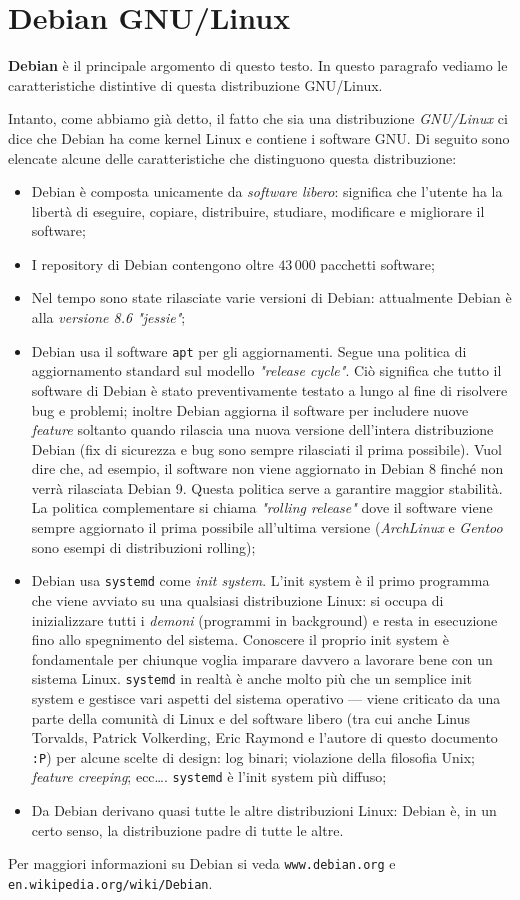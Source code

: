 \section{Debian GNU/Linux}
\textbf{Debian} è il principale argomento di questo testo. In questo paragrafo vediamo le caratteristiche distintive di questa distribuzione GNU/Linux.

Intanto, come abbiamo già detto, il fatto che sia una distribuzione \textit{GNU/Linux} ci dice che Debian ha come kernel Linux e contiene i software GNU. Di seguito sono elencate alcune delle caratteristiche che distinguono questa distribuzione:
\begin{itemize}
	\item Debian è composta unicamente da \textit{software libero}: significa che l'utente ha la libertà di eseguire, copiare, distribuire, studiare, modificare e migliorare il software;
	\item I repository di Debian contengono oltre \(43\,000\) pacchetti software;
	\item Nel tempo sono state rilasciate varie versioni di Debian: attualmente Debian è alla \textit{versione 8.6 "jessie"};
	\item Debian usa il software \texttt{apt} per gli aggiornamenti. Segue una politica di aggiornamento standard sul modello \textit{"release cycle"}. Ciò significa che tutto il software di Debian è stato preventivamente testato a lungo al fine di risolvere bug e problemi; inoltre Debian aggiorna il software per includere nuove \textit{feature} soltanto quando rilascia una nuova versione dell'intera distribuzione Debian (fix di sicurezza e bug sono sempre rilasciati il prima possibile). Vuol dire che, ad esempio, il software non viene aggiornato in Debian 8 finché non verrà rilasciata Debian 9. Questa politica serve a garantire maggior stabilità. La politica complementare si chiama \textit{"rolling release"} dove il software viene sempre aggiornato il prima possibile all'ultima versione (\textit{ArchLinux} e \textit{Gentoo} sono esempi di distribuzioni rolling);
	\item Debian usa \texttt{systemd} come \textit{init system}. L'init system è il primo programma che viene avviato su una qualsiasi distribuzione Linux: si occupa di inizializzare tutti i \textit{demoni} (programmi in background) e resta in esecuzione fino allo spegnimento del sistema. Conoscere il proprio init system è fondamentale per chiunque voglia imparare davvero a lavorare bene con un sistema Linux. \texttt{systemd} in realtà è anche molto più che un semplice init system e gestisce vari aspetti del sistema operativo --- viene criticato da una parte della comunità di Linux e del software libero (tra cui anche Linus Torvalds, Patrick Volkerding, Eric Raymond e l'autore di questo documento \texttt{:P}) per alcune scelte di design: log binari; violazione della filosofia Unix; \textit{feature creeping}; ecc\ldots. \texttt{systemd} è l'init system più diffuso;
	\item Da Debian derivano quasi tutte le altre distribuzioni Linux: Debian è, in un certo senso, la distribuzione padre di tutte le altre.
\end{itemize}
Per maggiori informazioni su Debian si veda \texttt{www.debian.org} e \texttt{en.wikipedia.org/wiki/Debian}.


